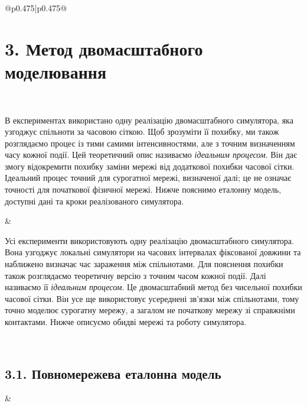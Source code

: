 ﻿\documentclass[11pt]{article}
\begin{document}
\begin{longtable}{@{}p{0.475\textwidth}|p{0.475\textwidth}@{}}
\begin{minipage}[t]{\linewidth}
\section*{3. Метод двомасштабного моделювання}
\end{minipage} \\[5mm]
\begin{minipage}[t]{\linewidth}
В експериментах використано одну реалізацію двомасштабного симулятора, яка узгоджує спільноти за часовою сіткою. Щоб зрозуміти її похибку, ми також розглядаємо процес із тими самими інтенсивностями, але з точним визначенням часу кожної події. Цей теоретичний опис називаємо \emph{ідеальним процесом}. Він дає змогу відокремити похибку заміни мережі від додаткової похибки часової сітки. Ідеальний процес точний для сурогатної мережі, визначеної далі; це не означає точності для початкової фізичної мережі. Нижче пояснимо еталонну модель, доступні дані та кроки реалізованого симулятора.
\end{minipage} &
\begin{minipage}[t]{\linewidth}
Усі експерименти використовують одну реалізацію двомасштабного симулятора. Вона узгоджує локальні симулятори на часових інтервалах фіксованої довжини та наближено визначає час зараження між спільнотами. Для пояснення похибки також розглядаємо теоретичну версію з точним часом кожної події. Далі називаємо її \emph{ідеальним процесом}. Це двомасштабний метод без чисельної похибки часової сітки. Він усе ще використовує усереднені зв'язки між спільнотами, тому точно моделює сурогатну мережу, а загалом не початкову мережу зі справжніми контактами. Нижче описуємо обидві мережі та роботу симулятора.
\end{minipage} \\[5mm]
\begin{minipage}[t]{\linewidth}
\subsection*{3.1. Повномережева еталонна модель}
\end{minipage} &
\begin{minipage}[t]{\linewidth}

\end{minipage}
\end{longtable}
\end{document}
